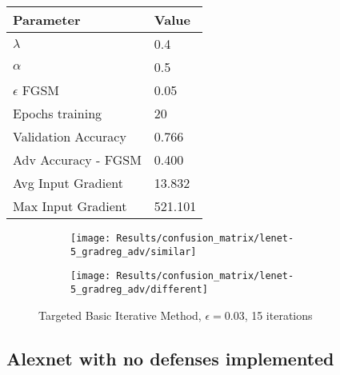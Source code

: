 \documentclass[draft,final]{vutinfth} %
\begin{document}
\begin{table}[h]
  \centering
  \begin{tabular}{ll}
    \toprule
			Parameter			& Value   \\
    \midrule
			$\lambda$								& 0.4			\\
			$\alpha$								& 0.5			\\
			$\epsilon$ FGSM					& 0.05		\\
			Epochs training					& 20			\\
			
			Validation Accuracy			& 0.766		\\ 
			Adv Accuracy - FGSM			& 0.400		\\
			
			Avg Input Gradient			& 13.832	\\
			Max Input Gradient			& 521.101	\\
    \bottomrule
  \end{tabular}
\end{table}


\begin{figure}[h]
  \begin{subfigure}[b]{0.5\columnwidth}
		\centering
    \texttt{[image: Results/confusion\_matrix/lenet-5\_gradreg\_adv/similar]}
    \label{fig:exp:cm:lenet-5_gradreg_adv:similar}
  \end{subfigure}
  \begin{subfigure}[b]{0.5\columnwidth}
		\centering
    \texttt{[image: Results/confusion\_matrix/lenet-5\_gradreg\_adv/different]}
    \label{fig:exp:cm:lenet-5_gradreg_adv:different}
  \end{subfigure}
  \caption{Targeted Basic Iterative Method, $\epsilon = 0.03$, 15 iterations}
  \label{fig:exp:cm:lenet-5_gradreg_adv}
\end{figure}
\clearpage


\subsection{Alexnet with no defenses implemented}
\end{document}
